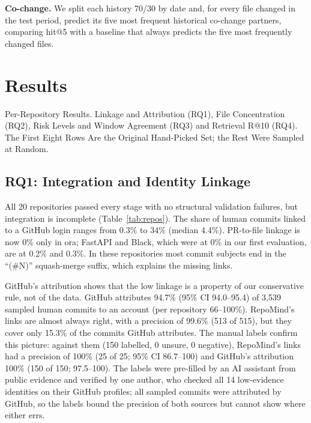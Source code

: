 \documentclass[conference]{IEEEtran}
\newcommand{\fixme}[1]{\textcolor{red}{#1}}
\newcommand{\res}[1]{#1}
\begin{document}
\textbf{Co-change.} We split each history 70/30 by date and, for every file changed in the test period, predict its five most frequent historical co-change partners, comparing hit@5 with a baseline that always predicts the five most frequently changed files.

\section{Results}
\begin{table}[t]
\caption{Per-Repository Results. Linkage and Attribution (RQ1), File Concentration (RQ2), Risk Levels and Window Agreement (RQ3) and Retrieval R@10 (RQ4). The First Eight Rows Are the Original Hand-Picked Set; the Rest Were Sampled at Random.}
\label{tab:repos}
\centering
\scriptsize
\setlength{\tabcolsep}{3pt}
\IfFileExists{tables/repos.tex}{}{%
\fbox{\parbox[c][2cm][c]{0.9\textwidth}{\centering\fixme{tables/repos.tex is generated from results/round2/*.csv by paper/build\_tables.py}}}}
\end{table}

\subsection{RQ1: Integration and Identity Linkage}
\label{sec:rq1}
All \res{20} repositories passed every stage with no structural validation failures, but integration is incomplete (Table~\ref{tab:repos}). The share of human commits linked to a GitHub login ranges from \res{0.3\%} to \res{34\%} (median \res{4.4\%}). PR-to-file linkage is now 0\% only in ora; FastAPI and Black, which were at 0\% in our first evaluation, are at \res{0.2\%} and \res{0.3\%}. In these repositories most commit subjects end in the ``(\#N)'' squash-merge suffix, which explains the missing links.

GitHub's attribution shows that the low linkage is a property of our conservative rule, not of the data. GitHub attributes \res{94.7\%} (95\% CI \res{94.0--95.4}) of \res{3{,}539} sampled human commits to an account (per repository \res{66--100\%}). RepoMind's links are almost always right, with a precision of \res{99.6\%} (\res{513} of \res{515}), but they cover only \res{15.3\%} of the commits GitHub attributes. The manual labels confirm this picture: against them (\res{150} labelled, \res{0} unsure, \res{0} negative), RepoMind's links had a precision of \res{100\%} (\res{25} of \res{25}; 95\% CI \res{86.7--100}) and GitHub's attribution \res{100\%} (\res{150} of \res{150}; \res{97.5--100}). The labels were pre-filled by an AI assistant from public evidence and verified by one author, who checked all \res{14} low-evidence identities on their GitHub profiles; all sampled commits were attributed by GitHub, so the labels bound the precision of both sources but cannot show where either errs.
\end{document}
